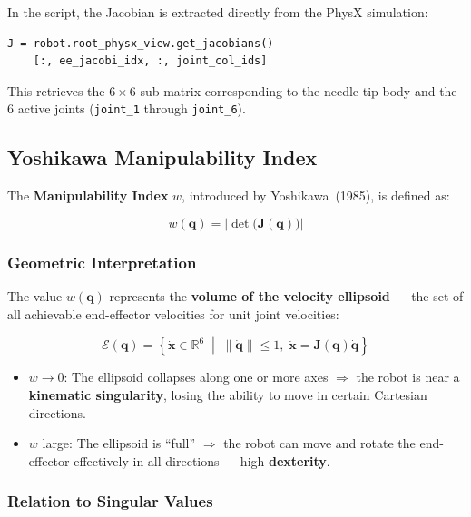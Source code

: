 \documentclass[a4paper,11pt]{article}
\begin{document}
In the script, the Jacobian is extracted directly from the PhysX simulation:

\begin{lstlisting}
J = robot.root_physx_view.get_jacobians()
    [:, ee_jacobi_idx, :, joint_col_ids]
\end{lstlisting}

This retrieves the $6 \times 6$ sub-matrix corresponding to the needle tip body and the 6 active joints (\texttt{joint\_1} through \texttt{joint\_6}).

\subsection{Yoshikawa Manipulability Index}

The \textbf{Manipulability Index} $w$, introduced by Yoshikawa~(1985)\cite{yoshikawa1985}, is defined as:

\begin{equation}
    \boxed{w(\mathbf{q}) = \left| \det\bigl(\mathbf{J}(\mathbf{q})\bigr) \right|}
    \label{eq:manip}
\end{equation}

\subsubsection{Geometric Interpretation}

The value $w(\mathbf{q})$ represents the \textbf{volume of the velocity ellipsoid} — the set of all achievable end-effector velocities for unit joint velocities:

\begin{equation}
    \mathcal{E}(\mathbf{q}) = \left\{ \dot{\mathbf{x}} \in \mathbb{R}^6 \;\middle|\; \|\dot{\mathbf{q}}\| \leq 1,\; \dot{\mathbf{x}} = \mathbf{J}(\mathbf{q})\dot{\mathbf{q}} \right\}
\end{equation}

\begin{itemize}
    \item $w \to 0$: The ellipsoid collapses along one or more axes $\Rightarrow$ the robot is near a \textbf{kinematic singularity}, losing the ability to move in certain Cartesian directions.
    \item $w$ large: The ellipsoid is ``full'' $\Rightarrow$ the robot can move and rotate the end-effector effectively in all directions — high \textbf{dexterity}.
\end{itemize}

\subsubsection{Relation to Singular Values}
\end{document}
